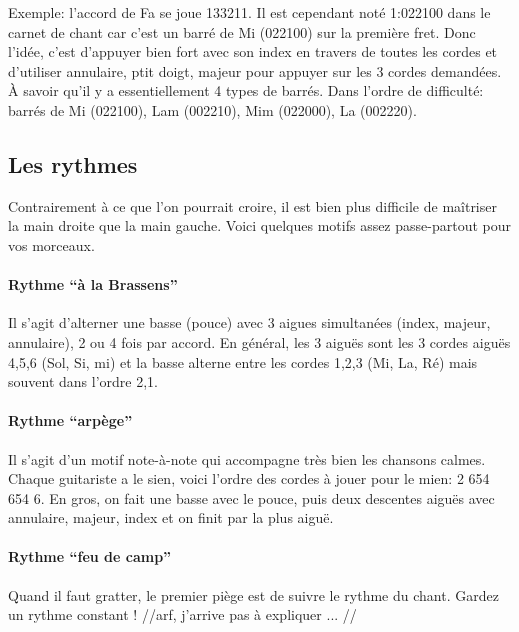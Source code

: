 \documentclass[a4paper]{article}
\begin{document}
Exemple: l'accord de Fa se joue 133211. Il est cependant noté 1:022100
dans le carnet de chant car c'est un barré de Mi (022100) sur la
première fret.  Donc l'idée, c'est d'appuyer bien fort avec son index
en travers de toutes les cordes et d'utiliser annulaire, ptit doigt,
majeur pour appuyer sur les 3 cordes demandées. À savoir qu'il y a
essentiellement 4 types de barrés.  Dans l'ordre de difficulté: barrés
de Mi (022100), Lam (002210), Mim (022000), La (002220).

\subsection{Les rythmes}

Contrairement à ce que l'on pourrait croire, il est bien plus
difficile de maîtriser la main droite que la main gauche.
Voici quelques motifs assez passe-partout pour vos morceaux.

\paragraph{Rythme ``à la Brassens''} Il s'agit d'alterner une basse (pouce)
avec 3 aigues simultanées (index, majeur, annulaire), 2 ou 4 fois par
accord. En général, les 3 aiguës sont les 3 cordes aiguës 4,5,6 (Sol,
Si, mi) et la basse alterne entre les cordes 1,2,3 (Mi, La, Ré) mais
souvent dans l'ordre 2,1.

\paragraph{Rythme ``arpège''} Il s'agit d'un motif note-à-note qui
accompagne très bien les chansons calmes. Chaque guitariste a le
sien, voici l'ordre des cordes à jouer pour le mien: 2 654 654 6. En
gros, on fait une basse avec le pouce, puis deux descentes aiguës avec
annulaire, majeur, index et on finit par la plus aiguë.

\paragraph{Rythme ``feu de camp''} Quand il faut gratter, le premier
piège est de suivre le rythme du chant. Gardez un rythme constant !
//arf, j'arrive pas à expliquer ... //


\end{document}

